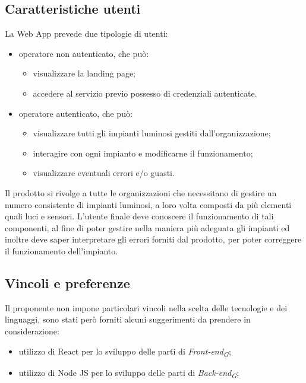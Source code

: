 \documentclass[a4paper, 12pt]{article}
\begin{document}
\subsection{Caratteristiche utenti}
La Web App prevede due tipologie di utenti:
\begin{itemize}
    \item operatore non autenticato, che può: \begin{itemize}
              \item visualizzare la landing page;
              \item accedere al servizio previo possesso di credenziali autenticate.
          \end{itemize}
    \item operatore autenticato, che può: \begin{itemize}
              \item visualizzare tutti gli impianti luminosi gestiti dall'organizzazione;
              \item interagire con ogni impianto e modificarne il funzionamento;
              \item visualizzare eventuali errori e/o guasti.
          \end{itemize}
\end{itemize}
Il prodotto si rivolge a tutte le organizzazioni che necessitano di gestire un
numero consistente di impianti luminosi, a loro volta composti da più elementi
quali luci e sensori. L'utente finale deve conoscere il funzionamento di tali
componenti, al fine di poter gestire nella maniera più adeguata gli impianti ed
inoltre deve saper interpretare gli errori forniti dal prodotto, per poter
correggere il funzionamento dell'impianto.

\subsection{Vincoli e preferenze}
Il proponente non impone particolari vincoli nella scelta delle tecnologie e dei linguaggi, sono stati però forniti alcuni suggerimenti da prendere in considerazione:
\begin{itemize}
    \item utilizzo di React per lo sviluppo delle parti di \textit{Front-end\textsubscript{G}};
    \item utilizzo di Node JS per lo sviluppo delle parti di \textit{Back-end\textsubscript{G}};
\end{itemize}
\end{document}
